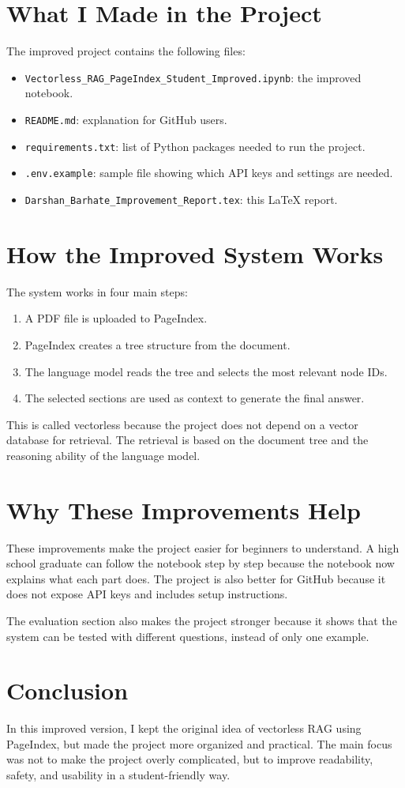 \documentclass[12pt]{article}
\begin{document}
\section{What I Made in the Project}
The improved project contains the following files:
\begin{itemize}[leftmargin=*]
    \item \texttt{Vectorless\_RAG\_PageIndex\_Student\_Improved.ipynb}: the improved notebook.
    \item \texttt{README.md}: explanation for GitHub users.
    \item \texttt{requirements.txt}: list of Python packages needed to run the project.
    \item \texttt{.env.example}: sample file showing which API keys and settings are needed.
    \item \texttt{Darshan\_Barhate\_Improvement\_Report.tex}: this LaTeX report.
\end{itemize}

\section{How the Improved System Works}
The system works in four main steps:
\begin{enumerate}[leftmargin=*]
    \item A PDF file is uploaded to PageIndex.
    \item PageIndex creates a tree structure from the document.
    \item The language model reads the tree and selects the most relevant node IDs.
    \item The selected sections are used as context to generate the final answer.
\end{enumerate}

This is called vectorless because the project does not depend on a vector database for retrieval. The retrieval is based on the document tree and the reasoning ability of the language model.

\section{Why These Improvements Help}
These improvements make the project easier for beginners to understand. A high school graduate can follow the notebook step by step because the notebook now explains what each part does. The project is also better for GitHub because it does not expose API keys and includes setup instructions.

The evaluation section also makes the project stronger because it shows that the system can be tested with different questions, instead of only one example.

\section{Conclusion}
In this improved version, I kept the original idea of vectorless RAG using PageIndex, but made the project more organized and practical. The main focus was not to make the project overly complicated, but to improve readability, safety, and usability in a student-friendly way.
\end{document}
